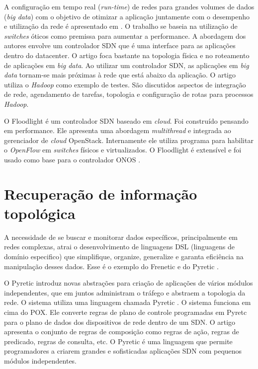 A configuração em tempo real (\emph{run-time}) de redes para
grandes volumes de dados (\emph{big data}) com o objetivo de otimizar a
aplicação juntamente com o desempenho e utilização da rede é apresentado
em \citep{programming2012guohui}.
O trabalho se baseia na utilização de \emph{switches} óticos como premissa
para aumentar a performance.
A abordagem dos autores envolve um controlador SDN que é uma
interface para as aplicações dentro do datacenter.
O artigo foca bastante na topologia física e no roteamento de
aplicações em \emph{big data}.
Ao utilizar um controlador SDN, as aplicações em \emph{big data} tornam-se
mais próximas à rede que está abaixo da aplicação.
O artigo utiliza o \emph{Hadoop} como exemplo de testes. São discutidos
aspectos de integração de rede, agendamento de tarefas, topologia e
configuração de rotas para processos \emph{Hadoop}.

O Floodlight \citep{floodlight2016} é um controlador SDN baseado em
\emph{cloud}.
Foi construído pensando em performance.
Ele apresenta uma abordagem \emph{multithread} e integrada ao gerenciador
de \emph{cloud} OpenStack.
Internamente ele utiliza programa para habilitar o \emph{OpenFlow} em
\emph{switches} físicos e virtualizados.
O Floodlight é extensível e foi usado como base para o controlador
ONOS \citep{berde2016onos}.


\section{Recuperação de informação topológica}

A necessidade de se buscar e monitorar dados
específicos, principalmente em redes complexas, atrai o desenvolvimento
de linguagens DSL (linguagens de domínio especifico) que simplifique,
organize, generalize e garanta eficiência na manipulação desses dados.
Esse é o exemplo do Frenetic \citep{foster2011frenetic}
e do Pyretic \citep{monsanto2013composing}.

O Pyretic introduz novas abstrações para criação de aplicações de vários
módulos independentes, que em juntos administram o tráfego e
abstraem a topologia da rede.
O sistema utiliza uma linguagem chamada Pyretic \citep{monsanto2013composing}.
O sistema funciona em cima do POX.
Ele converte regras de plano de controle programadas em Pyretc para o plano
de dados dos dispositivos de rede dentro de um SDN.
O artigo apresenta o conjunto de regras de composição como regras de ação,
regras de predicado, regras de consulta, etc.
O Pyretic é uma linguagem que permite programadores a criarem grandes e
sofisticadas aplicações SDN com pequenos módulos independentes.

